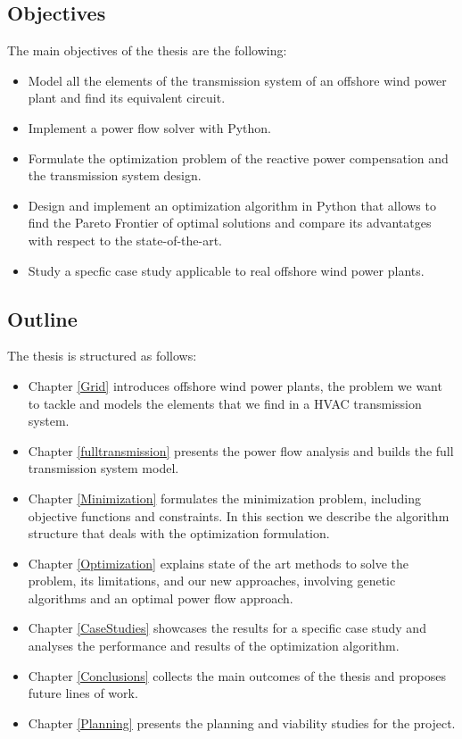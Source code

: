 \documentclass[a4paper,11pt, titlepage, twoside]{article}
\begin{document}
\subsection{Objectives}\label{objectives}

The main objectives of the thesis are the following:
\begin{itemize}
    \item Model all the elements of the transmission system of an offshore wind power plant and find its equivalent circuit.
    \item Implement a power flow solver with Python.
    \item Formulate the optimization problem of the reactive power compensation and the transmission system design. 
    \item Design and implement an optimization algorithm in Python that allows to find the Pareto Frontier of optimal solutions and compare its advantatges with respect to the state-of-the-art.
    \item Study a specfic case study applicable to real offshore wind power plants.
  \end{itemize}


\subsection{Outline}

The thesis is structured as follows:
\begin{itemize}
    \item Chapter \ref{Grid} introduces offshore wind power plants, the problem we want to tackle and models the elements that we find in a HVAC transmission system.
    \item Chapter \ref{fulltransmission} presents the power flow analysis and builds the full transmission system model. 
    \item Chapter \ref{Minimization}  formulates the minimization problem, including objective functions and constraints. In this section we describe
    the algorithm structure that deals with the optimization formulation.
    \item Chapter \ref{Optimization} explains state of the art methods to solve the problem, its limitations, and our new approaches, involving
    genetic algorithms and  an optimal power flow approach.
    \item Chapter \ref{CaseStudies} showcases  the results for a specific case study and analyses the performance and results of the optimization algorithm.
    \item Chapter \ref{Conclusions} collects the main outcomes of the thesis and proposes future lines of work.
    \item Chapter \ref{Planning} presents the planning and viability studies for the project.
\end{itemize}
\end{document}
